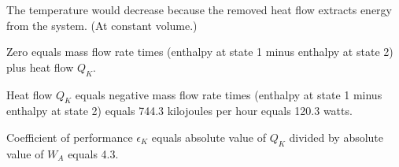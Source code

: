 The temperature would decrease because the removed heat flow extracts energy from the system. (At constant volume.)

Zero equals mass flow rate times (enthalpy at state 1 minus enthalpy at state 2) plus heat flow \( Q_K \).  

Heat flow \( Q_K \) equals negative mass flow rate times (enthalpy at state 1 minus enthalpy at state 2) equals 744.3 kilojoules per hour equals 120.3 watts.  

Coefficient of performance \( \epsilon_K \) equals absolute value of \( Q_K \) divided by absolute value of \( W_A \) equals 4.3.